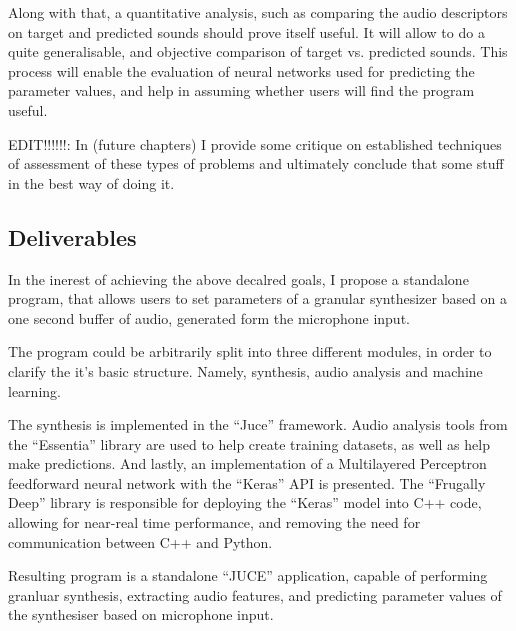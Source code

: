 Along with that, a quantitative analysis, such as comparing the audio
descriptors on target and predicted sounds should prove itself useful.
It will allow to do a quite generalisable, and objective comparison of
target vs. predicted sounds. This process will enable the evaluation
of neural networks used for predicting the parameter values, and help
in assuming whether users will find the program useful.  

EDIT!!!!!!:
In (future chapters) I provide some critique on established techniques of
assessment of these types of problems and ultimately conclude that some stuff in
the best way of doing it.

\subsection{Deliverables}

In the inerest of achieving the above decalred goals, I propose a
standalone program, that allows users to set parameters of a granular
synthesizer based on a one second buffer of audio, generated form the
microphone input.

The program could be arbitrarily split into three different modules,
in order to clarify the it's basic structure. Namely, synthesis, audio
analysis and machine learning.

The synthesis is implemented in the ``Juce'' framework. Audio analysis
tools from the ``Essentia'' library are used to help create training
datasets, as well as help make predictions. And lastly, an
implementation of a Multilayered Perceptron feedforward neural network
with the ``Keras'' API is presented. The ``Frugally Deep'' library is
responsible for deploying the ``Keras'' model into C++ code, allowing
for near-real time performance, and removing the need for
communication between C++ and Python. 

Resulting program is a standalone ``JUCE'' application, capable of
performing granluar synthesis, extracting audio features, and
predicting parameter values of the synthesiser based on microphone
input.



